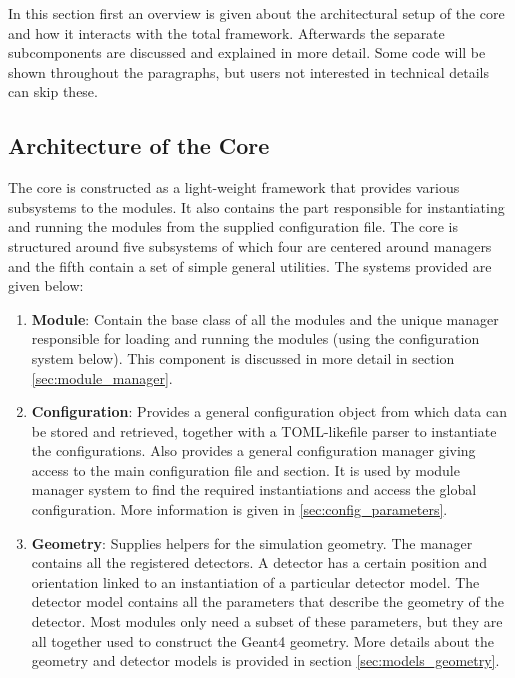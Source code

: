 In this section first an overview is given about the architectural setup of the core and how it interacts with the total \apsq framework. Afterwards the separate subcomponents are discussed and explained in more detail. Some code will be shown throughout the paragraphs, but users not interested in technical details can skip these.

\subsection{Architecture of the Core}
The core is constructed as a light-weight framework that provides various subsystems to the modules. It also contains the part responsible for instantiating and running the modules from the supplied configuration file. The core is structured around five subsystems of which four are centered around managers and the fifth contain a set of simple general utilities. The systems provided are given below:
\begin{enumerate}
\item \textbf{Module}: Contain the base class of all the \apsq modules and the unique manager responsible for loading and running the modules (using the configuration system below). This component is discussed in more detail in section \ref{sec:module_manager}. 
\item \textbf{Configuration}: Provides a general configuration object from which data can be stored and retrieved, together with a TOML-like\needref file parser to instantiate the configurations. Also provides a general \apsq configuration manager giving access to the main configuration file and section. It is used by module manager system to find the required instantiations and access the global configuration. More information is given in \ref{sec:config_parameters}.
\item \textbf{Geometry}: Supplies helpers for the simulation geometry. The manager contains all the registered detectors. A detector has a certain position and orientation linked to an instantiation of a particular detector model. The detector model contains all the parameters that describe the geometry of the detector. Most modules only need a subset of these parameters, but they are all together used to construct the Geant4 geometry. More details about the geometry and detector models is provided in section \ref{sec:models_geometry}.
\end{enumerate}

